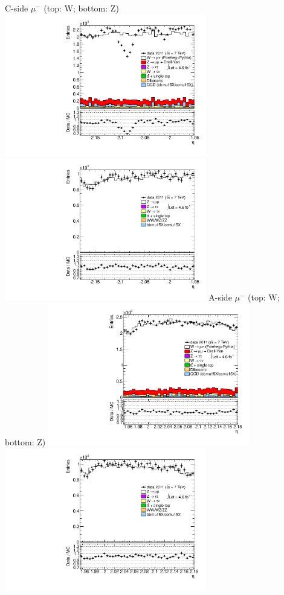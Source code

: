 {
\colb[T]
C-side $\mu^{-}$ (top: W; bottom: Z)
\centering
\includegraphics[width=0.66\textwidth]{dates/20130306/figures/etaphi/WpLtoL_10_C_stack_l_eta_NEG} \\
\includegraphics[width=0.66\textwidth]{dates/20130306/figures/etaphi/Z_10_C_stack_lN_eta_ALL.pdf}
A-side $\mu^{-}$ (top: W; bottom: Z)
\centering
\includegraphics[width=0.66\textwidth]{dates/20130306/figures/etaphi/WpLtoL_10_A_stack_l_eta_NEG} \\
\includegraphics[width=0.66\textwidth]{dates/20130306/figures/etaphi/Z_10_A_stack_lN_eta_ALL.pdf} 
\cole
}
